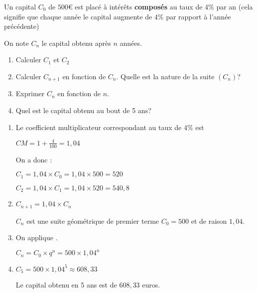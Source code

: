 
%
Un capital $C_{0}$ de $500$€ est placé à intérêts \textbf{composés} au taux de $4\%$ par an (cela signifie que chaque année le capital augmente de $4\%$ par rapport à l'année précédente)
\par
On note $C_{n}$ le capital obtenu après $n$ années.
\begin{enumerate}
     \item
     Calculer $C_{1}$ et $C_{2}$
     \item
     Calculer $C_{n+1}$ en fonction de $C_{n}$. Quelle est la nature de la suite $\left(C_{n}\right)$?
     \item
     Exprimer $C_{n}$ en fonction de $n$.
     \item
     Quel est le capital obtenu au bout de 5 ans? 
\end{enumerate}
\begin{corrige}
     \begin{enumerate}
          \item
          Le coefficient multiplicateur correspondant au taux de $4\%$ est
          \par
          $CM=1+\frac{4}{100}=1,04$
          \par
          On a donc :
          \par
          $C_{1}=1,04\times C_{0}=1,04\times 500=520$
          \par
          $C_{2}=1,04\times C_{1}=1,04\times 520=540,8$
          \item
          $C_{n+1}=1,04\times C_{n}$
          \par
          $C_{n}$ est une suite géométrique de premier terme $C_{0}=500$ et de raison $1,04$.
          \item
          On applique .
          \par
          $C_{n}=C_{0}\times q^{n}=500\times 1,04^{n}$
          \item
          $C_{5}=500\times 1,04^{5}\approx 608,33$
          \par
          Le capital obtenu en 5 ans est de $608,33$ euros.
     \end{enumerate}
\end{corrige}
